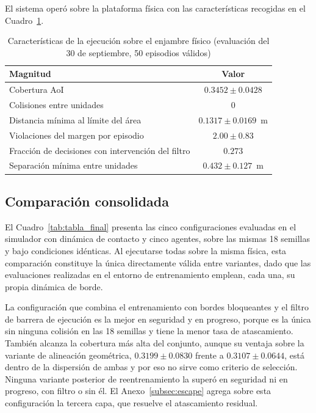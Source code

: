 El sistema operó sobre la plataforma física con las características recogidas
en el Cuadro~\ref{tab:ejecucion_fisica}.

\begin{table}[h]
    \centering\captionsetup{width=0.9\linewidth}
    \caption{Características de la ejecución sobre el enjambre físico
             (evaluación del 30 de septiembre, 50 episodios válidos)}
    \begin{tabular}{lc}
        \textbf{Magnitud} & \textbf{Valor} \\
        \hline
        Cobertura AoI & $0{.}3452 \pm 0{.}0428$ \\
        Colisiones entre unidades & $0$ \\
        Distancia mínima al límite del área & $0{.}1317 \pm 0{.}0169$~m \\
        Violaciones del margen por episodio & $2{.}00 \pm 0{.}83$ \\
        Fracción de decisiones con intervención del filtro & $0{.}273$ \\
        Separación mínima entre unidades & $0{.}432 \pm 0{.}127$~m \\
    \end{tabular}
    \label{tab:ejecucion_fisica}
\end{table}

\subsection*{Comparación consolidada}

El Cuadro~\ref{tab:tabla_final} presenta las cinco configuraciones evaluadas
en el simulador con dinámica de contacto y cinco agentes, sobre las mismas 18
semillas y bajo condiciones idénticas. Al ejecutarse todas sobre la misma
física, esta comparación constituye la única directamente válida entre
variantes, dado que las evaluaciones realizadas en el entorno de entrenamiento
emplean, cada una, su propia dinámica de borde.

La configuración que combina el entrenamiento con bordes bloqueantes y el filtro de barrera de ejecución es la mejor en seguridad y en progreso, porque es la única sin ninguna colisión en las 18 semillas y tiene la menor tasa de atascamiento. También alcanza la cobertura más alta del conjunto, aunque su ventaja sobre la variante de alineación geométrica, $0{.}3199 \pm 0{.}0830$ frente a $0{.}3107 \pm 0{.}0644$, está dentro de la dispersión de ambas y por eso no sirve como criterio de selección. Ninguna variante posterior de reentrenamiento la superó en seguridad ni en progreso, con filtro o sin él. El Anexo~\ref{subsec:escape} agrega sobre esta configuración la tercera capa, que resuelve el atascamiento residual.

